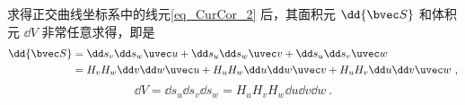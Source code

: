 求得正交曲线坐标系中的线元\autoref{eq_CurCor_2} 后，其面积元 $\dd {\bvec S}$ 和体积元 $\dd V$ 非常任意求得，即是
\begin{equation}\label{eq_CurCor_4}
\begin{aligned}
\dd {\bvec S}&=\dd s_v\dd s _w \uvec u+\dd s_u\dd s _w \uvec v+\dd s_u\dd s _v \uvec w\\
&=H_vH_w\dd v\dd w\uvec u+H_uH_w\dd u\dd w\uvec v+H_uH_v\dd u\dd v\uvec w~,
\end{aligned}
\end{equation}
\begin{equation}
\dd V=\dd s_u\dd s_v\dd s_w=H_uH_vH_w\dd u\dd v\dd w~.
\end{equation}
